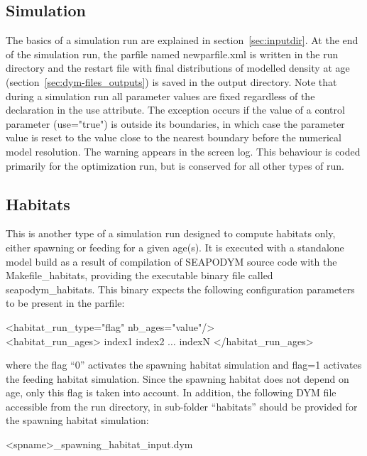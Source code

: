 \subsection{Simulation}\label{sec:simulation-run} 
The basics of a simulation run are explained in section~\ref{sec:inputdir}. At the end of the simulation run, the parfile named {\ttfamily newparfile.xml} is written in the run directory and the restart file with final distributions of modelled density at age (section~\ref{sec:dym-files_outputs}) is saved in the output directory. Note that during a simulation run all parameter values are fixed regardless of the declaration in the {\ttfamily use} attribute. The exception occurs if the value of a control parameter ({\ttfamily use="true"}) is outside its boundaries, in which case the parameter value is reset to the value close to the nearest boundary before the numerical model resolution. The warning appears in the screen log. This behaviour is coded primarily for the optimization run, but is conserved for all other types of run.

\subsection{Habitats}\label{sec:habitat-run}
This is another type of a simulation run designed to compute habitats only, either spawning or feeding for a given age(s). It is executed with a standalone model build as a result of  compilation of SEAPODYM source code with the {\ttfamily Makefile\_habitats}, providing the executable binary file called {\ttfamily seapodym\_habitats}. This binary expects the following configuration parameters to be present in the parfile:

\vspace{0.35cm}
{\ttfamily
<habitat\_run\_type="flag" nb\_ages="value"/>\\
\indent <habitat\_run\_ages> index1 index2 $\dots$ indexN </habitat\_run\_ages>\\
}

\noindent where the {\ttfamily flag} ``0'' activates the spawning habitat simulation and flag=1 activates the feeding habitat simulation. Since the spawning habitat does not depend on age, only this flag is taken into account. In addition, the following DYM file accessible from the run directory, in sub-folder ``habitats'' should be provided for the spawning habitat simulation:

\vspace{0.2cm}
{\ttfamily 
\indent <spname>\_spawning\_habitat\_input.dym\\
} 

